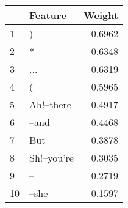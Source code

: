 \begin{tabular}{llr}
\toprule
{} &      Feature &  Weight \\
\midrule
1  &            ) &  0.6962 \\
2  &            * &  0.6348 \\
3  &          ... &  0.6319 \\
4  &            ( &  0.5965 \\
5  &   Ah!--there &  0.4917 \\
6  &        --and &  0.4468 \\
7  &        But-- &  0.3878 \\
8  &  Sh!--you're &  0.3035 \\
9  &           -- &  0.2719 \\
10 &        --she &  0.1597 \\
\bottomrule
\end{tabular}
